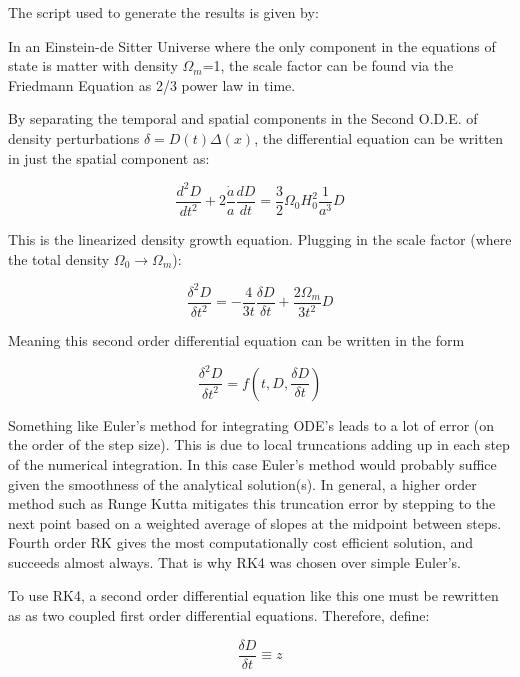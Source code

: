 The script used to generate the results is given by:



In an Einstein-de Sitter Universe where the only component in the equations of state is matter with density $\Omega_m$=1, the scale factor can be found via the Friedmann Equation as 2/3 power law in time.

By separating the temporal and spatial components in the Second O.D.E. of density perturbations $\delta = D(t)\Delta(x)$, the differential equation can be written in just the spatial component as:

\begin{equation}
  \frac{d^2D}{dt^2}+2\frac{\dot{a}}{a}\frac{dD}{dt}=\frac{3}{2}\Omega_0H_0^2\frac{1}{a^3}D
\end{equation}

This is the linearized density growth equation. Plugging in the scale factor (where the total density $\Omega_0 \rightarrow \Omega_m$):

\begin{equation}
  \frac{\delta^2D}{\delta t^2}=-\frac{4}{3t}\frac{\delta D}{\delta t}+\frac{2\Omega_m}{3t^2}D
\end{equation}

Meaning this second order differential equation can be written in the form

\begin{equation}
  \frac{\delta^2D}{\delta t^2}=f\left(t,D,\frac{\delta D}{\delta t}\right)
\end{equation}

Something like Euler's method for integrating ODE's leads to a lot of error (on the order of the step size). This is due to local truncations adding up in each step of the numerical integration. In this case Euler's method would probably suffice given the smoothness of the analytical solution(s). In general, a higher order method such as Runge Kutta mitigates this truncation error by stepping to the next point based on a weighted average of slopes at the midpoint between steps. Fourth order RK gives the most computationally cost efficient solution, and succeeds almost always. That is why RK4 was chosen over simple Euler's.

To use RK4, a second order differential equation like this one must be rewritten as as two coupled first order differential equations. Therefore, define:

\begin{equation}
  \frac{\delta D}{\delta t} \equiv z
\end{equation}

